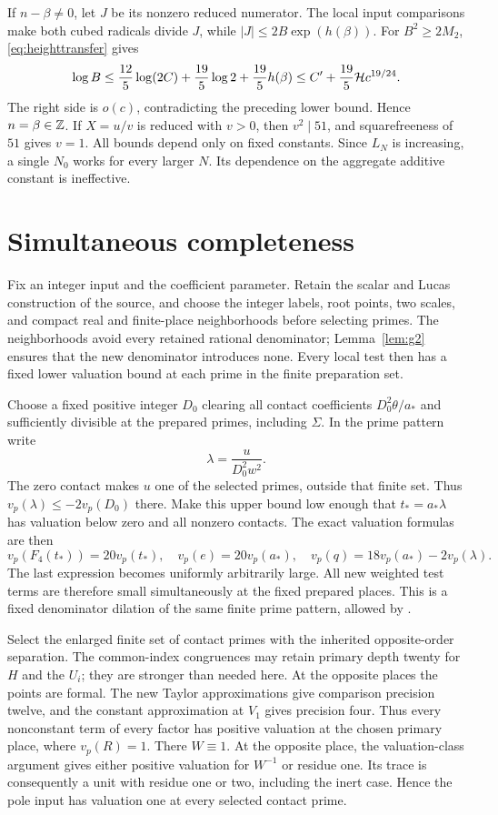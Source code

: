 \documentclass[11pt,a4paper]{article}
\begin{document}
If $n-\beta\ne0$, let $J$ be its nonzero reduced numerator.
The local input comparisons make both cubed radicals divide $J$,
while $|J|\le2B\exp(h(\beta))$. For $B^2\ge2M_2$,
\eqref{eq:heighttransfer} gives
\[
 \log B\le\frac{12}{5}\log(2C)+\frac{19}{5}\log2
                +\frac{19}{5}h(\beta)
 \le C'+\frac{19}{5}\mathcal H c^{19/24}.
\]
The right side is $o(c)$, contradicting the preceding lower bound.
Hence $n=\beta\in\mathbb Z$. If $X=u/v$ is reduced with $v>0$, then
$v^2\mid51$, and squarefreeness of $51$ gives $v=1$.
All bounds depend only on fixed constants. Since $L_N$ is increasing,
a single $N_0$ works for every larger $N$. Its dependence on the
aggregate additive constant is ineffective.

\section{Simultaneous completeness}
Fix an integer input and the coefficient parameter. Retain the scalar
and Lucas construction of the source, and choose the integer labels,
root points, two scales, and compact real and finite-place neighborhoods
before selecting primes. The neighborhoods avoid every retained
rational denominator; Lemma~\ref{lem:g2} ensures that the new
denominator introduces none. Every local test then has a fixed lower
valuation bound at each prime in the finite preparation set.

Choose a fixed positive integer $D_0$ clearing all contact coefficients
$D_0^2\theta/a_*$ and sufficiently divisible at the prepared primes,
including $\Sigma$. In the prime pattern write
\[
                         \lambda=\frac{u}{D_0^2w^2}.
\]
The zero contact makes $u$ one of the selected primes, outside that
finite set. Thus $v_p(\lambda)\le-2v_p(D_0)$ there. Make this upper
bound low enough that $t_*=a_*\lambda$ has valuation below zero and
all nonzero contacts. The exact valuation formulas are then
\[
 v_p(F_4(t_*))=20v_p(t_*),\quad v_p(e)=20v_p(a_*),\quad
 v_p(q)=18v_p(a_*)-2v_p(\lambda).
\]
The last expression becomes uniformly arbitrarily large. All new
weighted test terms are therefore small simultaneously at the fixed
prepared places. This is a fixed denominator dilation of the same
finite prime pattern, allowed by \cite{Selection}.

Select the enlarged finite set of contact primes with the inherited
opposite-order separation. The common-index congruences may retain
primary depth twenty for $H$ and the $U_i$; they are stronger than
needed here. At the opposite places the points are formal. The new
Taylor approximations give comparison precision twelve, and the
constant approximation at $V_1$ gives precision four. Thus every
nonconstant term of every factor has positive valuation at the chosen
primary place, where $v_p(R)=1$. There $W\equiv1$. At the opposite
place, the valuation-class argument gives either positive valuation
for $W^{-1}$ or residue one. Its trace is consequently a unit with
residue one or two, including the inert case. Hence the pole input
has valuation one at every selected contact prime.
\end{document}
